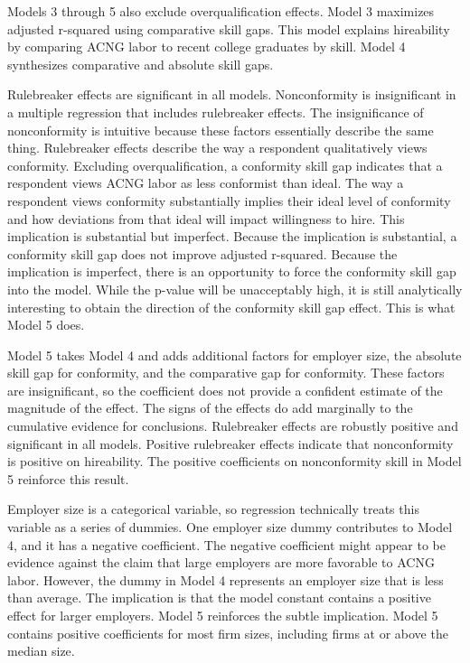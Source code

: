 \documentclass[review]{elsarticle}
\begin{document}
Models 3 through 5 also exclude overqualification effects.
Model 3 maximizes adjusted r-squared using comparative skill gaps.
This model explains hireability by comparing ACNG labor to recent college graduates by skill.
Model 4 synthesizes comparative and absolute skill gaps.



Rulebreaker effects are significant in all models.
Nonconformity is insignificant in a multiple regression that includes rulebreaker effects.
The insignificance of nonconformity is intuitive because these factors essentially describe the same thing.
Rulebreaker effects describe the way a respondent qualitatively views conformity.
Excluding overqualification, a conformity skill gap indicates that a respondent views ACNG labor as less conformist than ideal.
The way a respondent views conformity substantially implies their ideal level of conformity and how deviations from that ideal will impact willingness to hire.
This implication is substantial but imperfect.
Because the implication is substantial, a conformity skill gap does not improve adjusted r-squared.
Because the implication is imperfect, there is an opportunity to force the conformity skill gap into the model.
While the p-value will be unacceptably high, it is still analytically interesting to obtain the direction of the conformity skill gap effect.
This is what Model 5 does.

Model 5 takes Model 4 and adds additional factors for employer size,
the absolute skill gap for conformity,
and the comparative gap for conformity.
These factors are insignificant, so the coefficient does not provide a confident estimate of the magnitude of the effect.
The signs of the effects do add marginally to the cumulative evidence for conclusions.
Rulebreaker effects are robustly positive and significant in all models.
Positive rulebreaker effects indicate that nonconformity is positive on hireability.
The positive coefficients on nonconformity skill in Model 5 reinforce this result.

Employer size is a categorical variable, so regression technically treats this variable as a series of dummies.
One employer size dummy contributes to Model 4, and it has a negative coefficient.
The negative coefficient might appear to be evidence against the claim that large employers
are more favorable to ACNG labor.
However, the dummy in Model 4 represents an employer size that is less than average.
The implication is that the model constant contains a positive effect for larger employers.
Model 5 reinforces the subtle implication.
Model 5 contains positive coefficients for most firm sizes, including firms at or above the median size.
\end{document}
